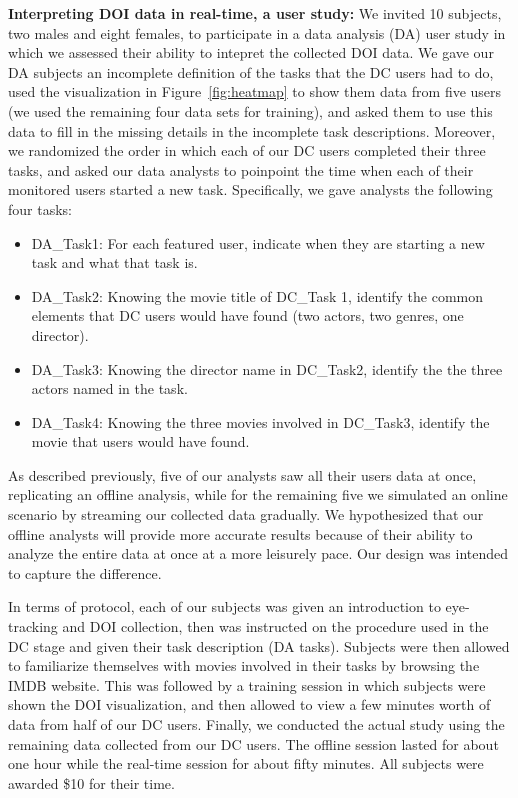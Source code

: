 \textbf{Interpreting DOI data in real-time, a user study:} We invited 10 subjects, two males and eight females, to participate in a data analysis (DA) user study in which we assessed their ability to intepret the collected DOI data. We gave our DA subjects an incomplete definition of the tasks that the DC users had to do, used the visualization in Figure~\ref{fig:heatmap} to show them data from five users (we used the remaining four data sets for training), and asked them to use this data to fill in the missing details in the incomplete task descriptions. Moreover, we randomized the order in which each of our DC users completed their three tasks, and asked our data analysts to poinpoint the time when each of their monitored users started a new task. Specifically, we gave analysts the following four tasks:  
\begin{itemize}
	\item DA\_Task1: For each featured user, indicate when they are starting a new task and what that task is.
	\item DA\_Task2: Knowing the movie title of DC\_Task 1, identify the common elements that DC users would have found (two actors, two genres, one director).
	\item DA\_Task3: Knowing the director name in DC\_Task2, identify the the three actors named in the task.
	\item DA\_Task4: Knowing the three movies involved in DC\_Task3, identify the movie that users would have found. 

\end{itemize}

As described previously, five of our analysts saw all their users data at once, replicating an offline analysis, while for the remaining five we simulated an online scenario  by streaming our collected data gradually. We hypothesized that our offline analysts will provide more accurate results because of their ability to analyze the entire data at once at a more leisurely pace. Our design was intended to capture the difference.  

In terms of protocol, each of our subjects was given an introduction to eye-tracking and DOI collection, then was instructed on the procedure used in the DC stage and given their task description (DA tasks). Subjects were then allowed to familiarize themselves with movies involved in their tasks by browsing the IMDB website. This was followed by a training session in which subjects were shown the DOI visualization, and then allowed to view a few minutes worth of data from half of our DC users. Finally, we conducted the actual study using the remaining data collected from our DC users.   The offline session lasted for about one hour while the real-time session for about fifty minutes. All subjects were awarded \$10 for their time.



